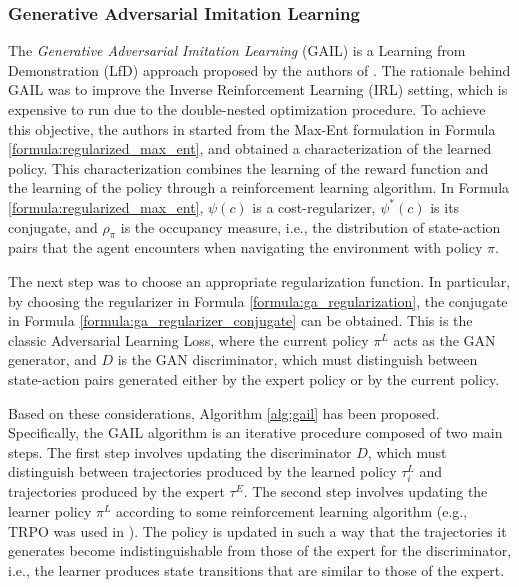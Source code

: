 \subsubsection{Generative Adversarial Imitation Learning}
\label{sec:gail}
The \textit{Generative Adversarial Imitation Learning} (GAIL) is a Learning from Demonstration (LfD) approach proposed by the authors of \cite{ho2016gail}. The rationale behind GAIL was to improve the Inverse Reinforcement Learning (IRL) setting, which is expensive to run due to the double-nested optimization procedure. To achieve this objective, the authors in \cite{ho2016gail} started from the Max-Ent formulation in Formula \ref{formula:regularized_max_ent}, and obtained a characterization of the learned policy. This characterization combines the learning of the reward function and the learning of the policy through a reinforcement learning algorithm. In Formula \ref{formula:regularized_max_ent}, $\psi(c)$ is a cost-regularizer, $\psi^{*}(c)$ is its conjugate, and $\rho_{\pi}$ is the occupancy measure, i.e., the distribution of state-action pairs that the agent encounters when navigating the environment with policy $\pi$. 

The next step was to choose an appropriate regularization function. In particular, by choosing the regularizer in Formula \ref{formula:ga_regularization}, the conjugate in Formula \ref{formula:ga_regularizer_conjugate} can be obtained. This is the classic Adversarial Learning Loss, where the current policy $\pi^{L}$ acts as the GAN generator, and $D$ is the GAN discriminator, which must distinguish between state-action pairs generated either by the expert policy or by the current policy.


Based on these considerations, Algorithm \ref{alg:gail} has been proposed. Specifically, the GAIL algorithm is an iterative procedure composed of two main steps. The first step involves updating the discriminator $D$, which must distinguish between trajectories produced by the learned policy $\tau^{L}_{i}$ and trajectories produced by the expert $\tau^{E}$. The second step involves updating the learner policy $\pi^{L}$ according to some reinforcement learning algorithm (e.g., TRPO was used in \cite{ho2016gail}). The policy is updated in such a way that the trajectories it generates become indistinguishable from those of the expert for the discriminator, i.e., the learner produces state transitions that are similar to those of the expert.


